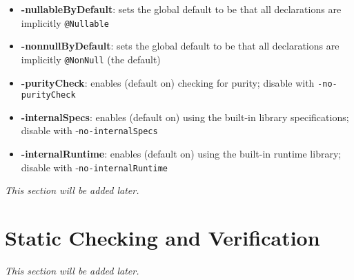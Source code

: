 \begin{itemize}[noitemsep,nolistsep]
\item \textbf{-nullableByDefault}: sets the global default to be that all declarations are implicitly \texttt{@Nullable}
\item \textbf{-nonnullByDefault}: sets the global default to be that all declarations are implicitly \texttt{@NonNull} (the default)
\item \textbf{-purityCheck}: enables (default on) checking for purity; disable with \texttt{-no-purityCheck}
\item \textbf{-internalSpecs}: enables (default on) using the built-in library specifications; disable with -\texttt{no-internalSpecs}
\item \textbf{-internalRuntime}: enables (default on) using the built-in runtime library; disable with -\texttt{no-internalRuntime}
\end{itemize}







\textit{This section will be added later.} %

\section{Static Checking and Verification}
\textit{This section will be added later.} %

